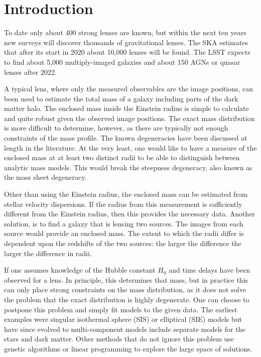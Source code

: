\documentclass[onecolumn,galley]{mn2e}
\begin{document}
\section{Introduction}

To date only about 400 strong lenses are known, but within the next ten years
new surveys will discover thousands of gravitational lenses. The SKA estimates
that after its start in 2020 about 10,000 lenses will be found. The LSST
expects to find about 5,000 multiply-imaged galaxies and about 150 AGNs or
quasar lenses after 2022.

A typical lens, where only the measured observables are the image positions,
can been used to estimate the total mass of a galaxy including parts of the
dark matter halo. The enclosed mass inside the Einstein radius is simple to
calculate and quite robust given the observed image positions. The exact mass
distribution is more difficult to determine, however, as there are typically
not enough constraints of the mass profile. The known degeneracies have been
discussed at length in the literature. At the very least, one would like to
have a measure of the enclosed mass at at least two distinct radii to be able
to distinguish between analytic mass models. This would break the steepness
degeneracy, also known as the mass sheet degeneracy.

Other than using the Einstein radius, the enclosed mass can be estimated
from stellar velocity dispersions. If the radius from this measurement
is sufficiently different from the Einstein radius, then this provides the
necessary data. Another solution, is to find a galaxy that is lensing two
sources. The images from each source would provide an enclosed mass. The
extent to which the radii differ is dependent upon the redshifts of the
two sources: the larger the difference the larger the difference in radii.

If one assumes knowledge of the Hubble constant $H_0$ and time delays have been
observed for a lens. In principle, this determines that mass, but in practice
this can only place strong constraints on the mass distribution, as it does not
solve the problem that the exact distribution is highly degenerate. One can
choose to postpone this problem and simply fit models to the given data.  The
earliest examples were singular isothermal sphere (SIS) or elliptical (SIE)
models but have since evolved to multi-component models include separate models
for the stars and dark matter. Other methods that do not ignore this problem
use genetic algorithms or linear programming to explore the large space of
solutions.
\end{document}
